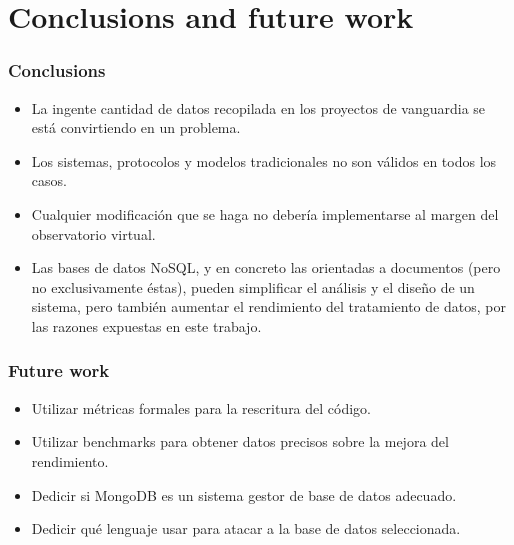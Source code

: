 \chapter{Conclusions and future work}


\subsection{Conclusions}

\begin{itemize}

\item La ingente cantidad de datos recopilada en los proyectos de vanguardia se está convirtiendo en un problema.

\item Los sistemas, protocolos y modelos tradicionales no son válidos en todos los casos.

\item Cualquier modificación que se haga no debería implementarse al margen del observatorio virtual.

\item Las bases de datos NoSQL, y en concreto las orientadas a documentos (pero no exclusivamente éstas), pueden simplificar el análisis y el diseño de un sistema, pero también aumentar el rendimiento del tratamiento de datos, por las razones expuestas en este trabajo.

\end{itemize}

\subsection{Future work}

\begin{itemize}

\item Utilizar métricas formales para la rescritura del código.

\item Utilizar benchmarks para obtener datos precisos sobre la mejora del rendimiento.

\item Dedicir si MongoDB es un sistema gestor de base de datos adecuado.

\item Dedicir qué lenguaje usar para atacar a la base de datos seleccionada.

\end{itemize}

